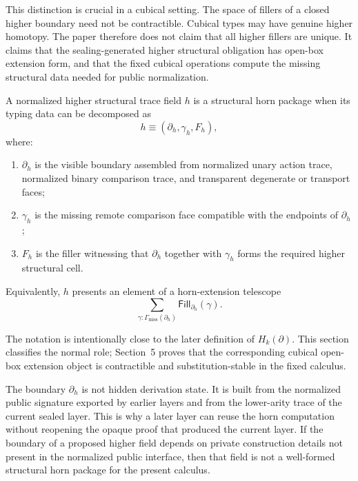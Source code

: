 This distinction is crucial in a cubical setting.  The space of fillers of a closed higher
boundary need not be contractible.  Cubical types may have genuine higher homotopy.  The
paper therefore does not claim that all higher fillers are unique.  It claims that the
sealing-generated higher structural obligation has open-box extension form, and that the
fixed cubical operations compute the missing structural data needed for public normalization.

\begin{definition}
A normalized higher structural trace field \(h\) is a structural horn package when its typing
data can be decomposed as
\[
  h \equiv (\partial_h,\gamma_h,F_h),
\]
where:
\begin{enumerate}
\item \(\partial_h\) is the visible boundary assembled from normalized unary action trace,
normalized binary comparison trace, and transparent degenerate or transport faces;
\item \(\gamma_h\) is the missing remote comparison face compatible with the endpoints of
\(\partial_h\);
\item \(F_h\) is the filler witnessing that \(\partial_h\) together with \(\gamma_h\) forms the
required higher structural cell.
\end{enumerate}
Equivalently, \(h\) presents an element of a horn-extension telescope
\[
  \sum_{\gamma:\Gamma_{\mathrm{miss}}(\partial_h)}
    \mathsf{Fill}_{\partial_h}(\gamma).
\]
\end{definition}

The notation is intentionally close to the later definition of \(H_k(\partial)\).  This
section classifies the normal role; Section~5 proves that the corresponding cubical
open-box extension object is contractible and substitution-stable in the fixed calculus.

\begin{remark}
The boundary \(\partial_h\) is not hidden derivation state.  It is built from the normalized
public signature exported by earlier layers and from the lower-arity trace of the current
sealed layer.  This is why a later layer can reuse the horn computation without reopening the
opaque proof that produced the current layer.  If the boundary of a proposed higher field
depends on private construction details not present in the normalized public interface, then
that field is not a well-formed structural horn package for the present calculus.
\end{remark}

